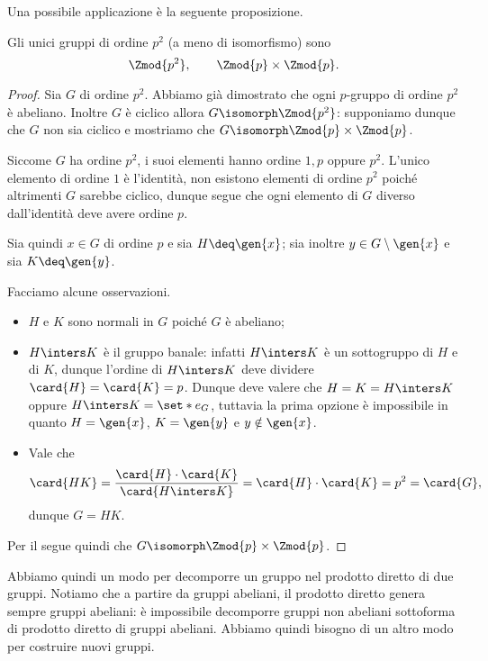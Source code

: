 Una possibile applicazione è la seguente proposizione.
\begin{proposition}
    {}{}
    Gli unici gruppi di ordine $p^2$ (a meno di isomorfismo) sono \[
        \Zmod{p^2}, \qquad \Zmod{p} \times \Zmod{p}.
    \] 
\end{proposition}
\begin{proof}
    Sia $G$ di ordine $p^2$. Abbiamo già dimostrato che ogni $p$-gruppo di ordine $p^2$ è abeliano. Inoltre $G$ è ciclico allora $G \isomorph \Zmod{p^2}$: supponiamo dunque che $G$ non sia ciclico e mostriamo che $G \isomorph \Zmod{p} \times \Zmod{p}$.
    
    Siccome $G$ ha ordine $p^2$, i suoi elementi hanno ordine $1, p$ oppure $p^2$. L'unico elemento di ordine $1$ è l'identità, non esistono elementi di ordine $p^2$ poiché altrimenti $G$ sarebbe ciclico, dunque segue che ogni elemento di $G$ diverso dall'identità deve avere ordine $p$.

    Sia quindi $x \in G$ di ordine $p$ e sia $H \deq \gen{x}$; sia inoltre $y \in G \setminus \gen{x}$ e sia $K \deq \gen{y}$.
    
    Facciamo alcune osservazioni. \begin{itemize}
        \item $H$ e $K$ sono normali in $G$ poiché $G$ è abeliano;
        \item $H \inters K$ è il gruppo banale: infatti $H \inters K$ è un sottogruppo di $H$ e di $K$, dunque l'ordine di $H \inters K$ deve dividere $\card{H} = \card{K} = p$. Dunque deve valere che $H = K = H \inters K$ oppure $H \inters K = \set*{e_G}$, tuttavia la prima opzione è impossibile in quanto $H = \gen{x}$, $K = \gen{y}$ e $y \notin \gen{x}$.
        \item Vale che \[
            \card{HK} = \frac{\card{H}\cdot\card{K}}{\card{H \inters K}} = \card{H} \cdot \card{K} = p^2 = \card{G}, 
        \] dunque $G = HK$.  
    \end{itemize}

    Per il  segue quindi che $G \isomorph \Zmod{p} \times \Zmod{p}$. 
\end{proof}

Abbiamo quindi un modo per decomporre un gruppo nel prodotto diretto di due gruppi. Notiamo che a partire da gruppi abeliani, il prodotto diretto genera sempre gruppi abeliani: è impossibile decomporre gruppi non abeliani sottoforma di prodotto diretto di gruppi abeliani. Abbiamo quindi bisogno di un altro modo per costruire nuovi gruppi.

